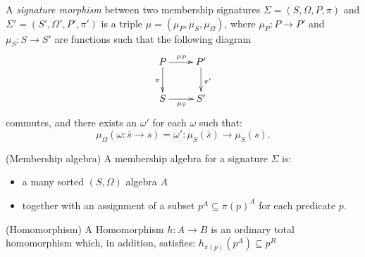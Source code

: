 \documentclass[10pt]{article}
\begin{document}
\begin{definition}
A {\it signature morphism} between two membership signatures $\Sigma =
(S,\Omega,P,\pi)$ and $\Sigma' = (S',\Omega',P',\pi')$ is a triple $\mu =
(\mu_P,\mu_S,\mu_{\Omega})$, where $\mu_P: P \to P'$ and $\mu_S: S \to S'$
are functions such that the following diagram
\[ \xymatrix{
   P \ar[d]_{\pi} \ar[r]^{\mu_P} & P' \ar[d]^{\pi'}	\\
   S \ar[r]_{\mu_S} & S'	}
\]
commutes, and there exists an $\omega'$ for each $\omega$ such that:
\[ \mu_{\Omega}(\omega: \overline{s} \to s) = \omega': \mu_S(\overline{s}) \to \mu_S(s) .\]
\end{definition}

\begin{definition} (Membership algebra)
A membership algebra for a signature $\Sigma$ is:
\begin{itemize} 
\item a many sorted $(S,\Omega)$ algebra $A$
\item together with an assignment of a subset $ p^A \subseteq {\pi(p)}^A$ for each predicate $p$.
\end{itemize}
\end{definition}

\begin{definition} (Homomorphism)
A Homomorphism $h:A \to B$ is an ordinary total homomorphism which, in
addition, satisfies: $h_{\pi(p)}(p^A) \subseteq p^B$
\end{definition}
\end{document}
